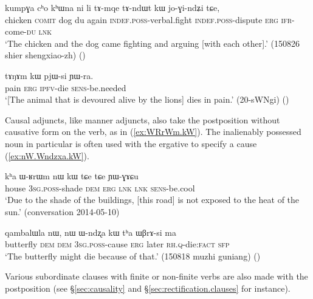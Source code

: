 \begin{exe}
\ex \label{ex:tAmqe.tAndWt.kW}
 \gll kumpɣa cʰo kʰɯna ni li tɤ-mqe tɤ-ndɯt kɯ jo-ɣi-ndʑi tɕe, \\
 chicken \textsc{comit} dog du again \textsc{indef}.\textsc{poss}-verbal.fight \textsc{indef}.\textsc{poss}-dispute \textsc{erg} \textsc{ifr}-come-\textsc{du} \textsc{lnk} \\
 \glt `The chicken and the dog came fighting and arguing [with each other].' (150826 shier shengxiao-zh)
()
\end{exe}

\begin{exe}
\ex \label{ex:tANAm.kW.pjWsi}
 \gll tɤŋɤm kɯ pjɯ-si ɲɯ-ra. \\
 pain \textsc{erg} \textsc{ipfv}-die \textsc{sens}-be.needed \\
 \glt `[The animal that is devoured alive by the lions] dies in pain.' (20-sWNgi) ()
\end{exe}

Causal adjuncts, like manner adjuncts, also take the postposition  without causative form on the verb, as in (\ref{ex:WRrWm.kW}). The inalienably possessed noun  in particular is often used with the ergative to specify a cause  (\ref{ex:nW.Wndzxa.kW}). 

\begin{exe}
\ex \label{ex:WRrWm.kW}
 \gll   kʰa ɯ-ʁrɯm nɯ kɯ tɕe tɕe ɲɯ-ɣɤɕu \\
house \textsc{3sg}.\textsc{poss}-shade \textsc{dem} \textsc{erg} \textsc{lnk} \textsc{lnk}  \textsc{sens}-be.cool \\
\glt `Due to the shade of the buildings, [this road] is not exposed to the heat of the sun.' (conversation 2014-05-10)
\end{exe}

 \begin{exe}
\ex \label{ex:nW.Wndzxa.kW}
 \gll   qambalɯla nɯ, nɯ ɯ-ndʐa kɯ tʰa ɯβrɤ-si ma \\
 butterfly \textsc{dem} \textsc{dem} \textsc{3sg}.\textsc{poss}-cause \textsc{erg}  later \textsc{rh}.\textsc{q}-die:\textsc{fact} \textsc{sfp} \\
 \glt `The butterfly might die because of that.' (150818 muzhi guniang)
()
\end{exe}
 

Various subordinate clauses with finite or non-finite verbs are also made with the postposition  (see §\ref{sec:causality} and §\ref{sec:rectification.clauses} for instance).

